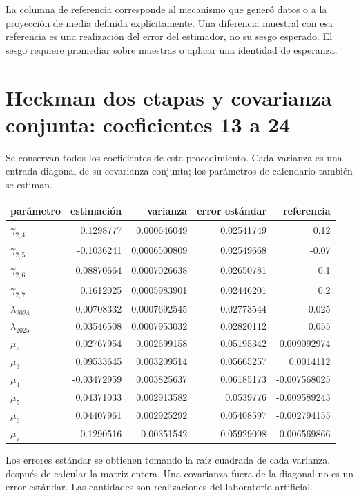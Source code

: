 \documentclass[11pt,a4paper]{article}
\begin{document}
La columna de referencia corresponde al mecanismo que generó datos o a la proyección de media definida explícitamente. Una diferencia muestral con esa referencia es una realización del error del estimador, no su sesgo esperado. El sesgo requiere promediar sobre muestras o aplicar una identidad de esperanza.

\clearpage
\section{Heckman dos etapas y covarianza conjunta: coeficientes 13 a 24}
Se conservan todos los coeficientes de este procedimiento. Cada varianza es una entrada diagonal de su covarianza conjunta; los parámetros de calendario también se estiman.
\begin{center}\small
\begin{tabular}{lrrrr}
\toprule
parámetro & estimación & varianza & error estándar & referencia\\\midrule
$\gamma_{2,4}$ & 0.1298777 & 0.000646049 & 0.02541749 & 0.12\\
$\gamma_{2,5}$ & -0.1036241 & 0.0006500809 & 0.02549668 & -0.07\\
$\gamma_{2,6}$ & 0.08870664 & 0.0007026638 & 0.02650781 & 0.1\\
$\gamma_{2,7}$ & 0.1612025 & 0.0005983901 & 0.02446201 & 0.2\\
$\lambda_{2024}$ & 0.00708332 & 0.0007692545 & 0.02773544 & 0.025\\
$\lambda_{2025}$ & 0.03546508 & 0.0007953032 & 0.02820112 & 0.055\\
$\mu_2$ & 0.02767954 & 0.002699158 & 0.05195342 & 0.009092974\\
$\mu_3$ & 0.09533645 & 0.003209514 & 0.05665257 & 0.0014112\\
$\mu_4$ & -0.03472959 & 0.003825637 & 0.06185173 & -0.007568025\\
$\mu_5$ & 0.04371033 & 0.002913582 & 0.0539776 & -0.009589243\\
$\mu_6$ & 0.04407961 & 0.002925292 & 0.05408597 & -0.002794155\\
$\mu_7$ & 0.1290516 & 0.00351542 & 0.05929098 & 0.006569866\\
\bottomrule
\end{tabular}\end{center}

Los errores estándar se obtienen tomando la raíz cuadrada de cada varianza, después de calcular la matriz entera. Una covarianza fuera de la diagonal no es un error estándar. Las cantidades son realizaciones del laboratorio artificial.
\end{document}
